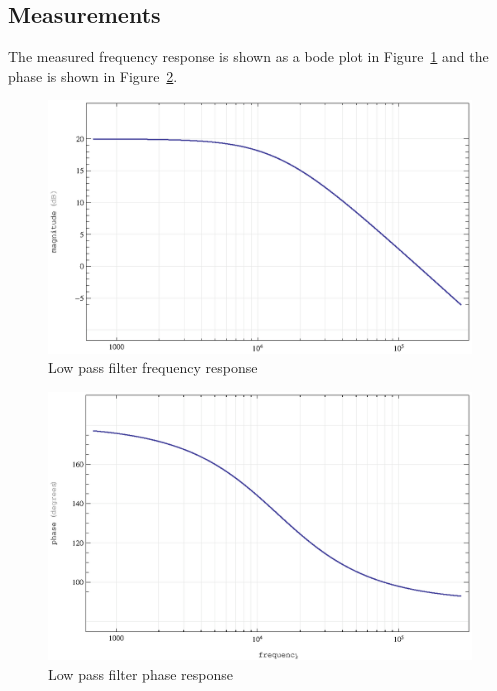 \documentclass[11pt,a4paper]{article}
\begin{document}
\subsection{Measurements}\label{lpf-measurements}
The measured frequency response is shown as a bode plot in
Figure~\ref{fig:lpf-magnitude} and the phase is shown in
Figure~\ref{fig:lpf-phase}.

\begin{figure}[htbp]
    \centering
        \includegraphics[]{img/lpf-magnitude.eps}
    \caption{Low pass filter frequency response}
    \label{fig:lpf-magnitude}
\end{figure}

\begin{figure}[htbp]
    \centering
        \includegraphics[]{img/lpf-phase.eps}
    \caption{Low pass filter phase response}
    \label{fig:lpf-phase}
\end{figure}
\end{document}

